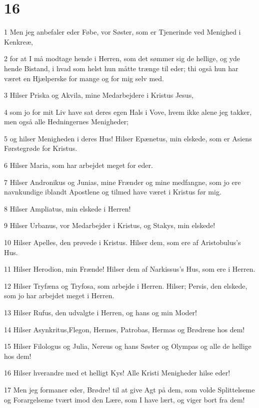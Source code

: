 \chapter{16}

\par 1 Men jeg anbefaler eder Føbe, vor Søster, som er Tjenerinde ved Menighed i Kenkreæ,
\par 2 for at I må modtage hende i Herren, som det sømmer sig de hellige, og yde hende Bistand, i hvad som helst hun måtte trænge til eder; thi også hun har været en Hjælperske for mange og for mig selv med.
\par 3 Hilser Priska og Akvila, mine Medarbejdere i Kristus Jesus,
\par 4 som jo for mit Liv have sat deres egen Hals i Vove, hvem ikke alene jeg takker, men også alle Hedningernes Menigheder;
\par 5 og hilser Menigheden i deres Hus! Hilser Epænetus, min elskede, som er Asiens Førstegrøde for Kristus.
\par 6 Hilser Maria, som har arbejdet meget for eder.
\par 7 Hilser Andronikus og Junias, mine Frænder og mine medfangne, som jo ere navnkundige iblandt Apostlene og tilmed have været i Kristus før mig.
\par 8 Hilser Ampliatus, min elskede i Herren!
\par 9 Hilser Urbanus, vor Medarbejder i Kristus, og Stakys, min elskede!
\par 10 Hilser Apelles, den prøvede i Kristus. Hilser dem, som ere af Aristobulus's Hus.
\par 11 Hilser Herodion, min Frænde! Hilser dem af Narkissus's Hus, som ere i Herren.
\par 12 Hilser Tryfæna og Tryfosa, som arbejde i Herren. Hilser; Persis, den elskede, som jo har arbejdet meget i Herren.
\par 13 Hilser Rufus, den udvalgte i Herren, og hans og min Moder!
\par 14 Hilser Asynkritus,Flegon, Hermes, Patrobas, Hermas og Brødrene hos dem!
\par 15 Hilser Filologus og Julia, Nereus og hans Søster og Olympas og alle de hellige hos dem!
\par 16 Hilser hverandre med et helligt Kys! Alle Kristi Menigheder hilse eder!
\par 17 Men jeg formaner eder, Brødre! til at give Agt på dem, som volde Splittelseme og Forargelseme tvært imod den Lære, som I have lært, og viger bort fra dem!
